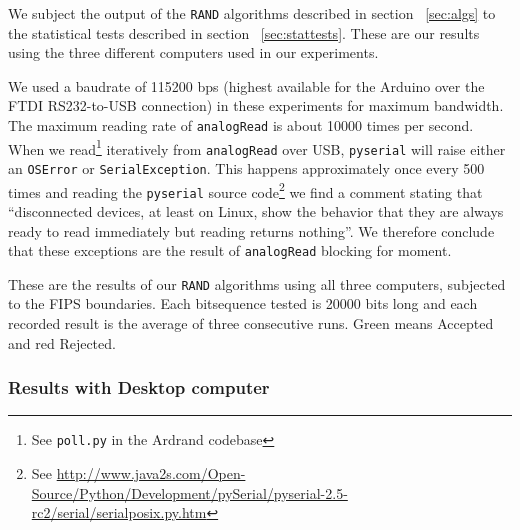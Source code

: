 \documentclass[a4paper]{article}           %
\begin{document}
We subject the output of the \texttt{RAND} algorithms described in section ~\ref{sec:algs} to the statistical tests described in section ~\ref{sec:stattests}. These are our results using the three different computers used in our experiments. 

We used a baudrate of 115200 bps (highest available for the Arduino over the FTDI RS232-to-USB connection) in these experiments for maximum bandwidth. The maximum reading rate of \texttt{analogRead} is about 10000 times per second\cite{ardref}. When we read\footnote{See \texttt{poll.py} in the Ardrand codebase} iteratively from \texttt{analogRead} over USB,  \texttt{pyserial} will raise either an \texttt{OSError} or \texttt{SerialException}. This happens approximately once every 500 times and reading the \texttt{pyserial} source code\footnote{See \url{http://www.java2s.com/Open-Source/Python/Development/pySerial/pyserial-2.5-rc2/serial/serialposix.py.htm}} we find a comment stating that ``disconnected devices, at least on Linux, show the behavior that they are always ready to read immediately but reading returns nothing''. We therefore conclude that these exceptions are the result of \texttt{analogRead} blocking for moment. 

These are the results of our \texttt{RAND} algorithms using all three computers, subjected to the FIPS boundaries. Each bitsequence tested is 20000 bits long and each recorded result is the average of three consecutive runs. Green means Accepted and red Rejected. 

\subsubsection{Results with Desktop computer}
\end{document}

